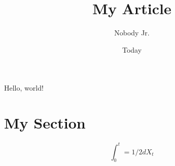 \documentclass{article}
\begin{document}
\title{My Article}
\author{Nobody Jr.}
\date{Today}
\maketitle



Hello, world!

\section{My Section}
\begin{equation}
	\int_0^t = 1/2 dX_t
\end{equation}
\cite{Khan2014Incentive}

\cite{Khan2014Incentive}
\printbibliography[
	heading=none
	]
\end{document}
